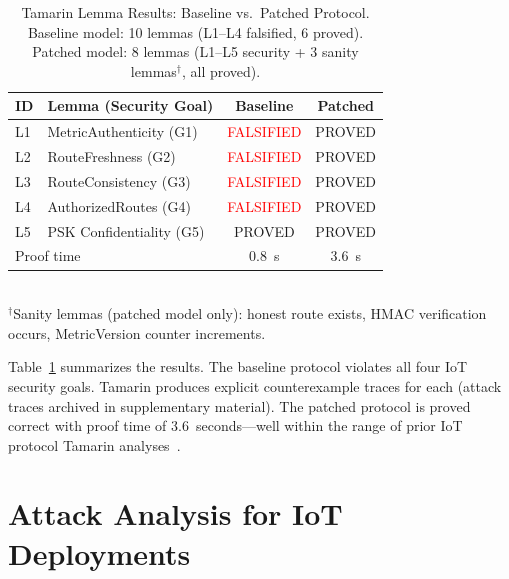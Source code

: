 \documentclass[10pt,journal,compsoc]{IEEEtran}
\begin{document}
\begin{table}[t]
  \centering
  \caption{Tamarin Lemma Results: Baseline vs.\ Patched Protocol.
    Baseline model: 10 lemmas (L1--L4 falsified, 6 proved).
    Patched model: 8 lemmas (L1--L5 security + 3 sanity lemmas$^\dagger$, all proved).}
  \label{tab:tamarin}
  \begin{tabular}{llcc}
    \toprule
    \textbf{ID} & \textbf{Lemma (Security Goal)} &
      \textbf{Baseline} & \textbf{Patched} \\
    \midrule
    L1 & MetricAuthenticity (G1)   & \textcolor{red}{FALSIFIED} & \textcolor{green!60!black}{PROVED} \\
    L2 & RouteFreshness (G2)       & \textcolor{red}{FALSIFIED} & \textcolor{green!60!black}{PROVED} \\
    L3 & RouteConsistency (G3)     & \textcolor{red}{FALSIFIED} & \textcolor{green!60!black}{PROVED} \\
    L4 & AuthorizedRoutes (G4)     & \textcolor{red}{FALSIFIED} & \textcolor{green!60!black}{PROVED} \\
    L5 & PSK Confidentiality (G5)  & \textcolor{green!60!black}{PROVED}  & \textcolor{green!60!black}{PROVED} \\
    \midrule
    \multicolumn{2}{l}{Proof time} & 0.8~s & 3.6~s \\
    \bottomrule
  \end{tabular}\\[2pt]
  \small $^\dagger$Sanity lemmas (patched model only): honest route exists,
    HMAC verification occurs, MetricVersion counter increments.
\end{table}

Table~\ref{tab:tamarin} summarizes the results. The baseline protocol
violates all four IoT security goals. Tamarin produces explicit
counterexample traces for each (attack traces archived in supplementary
material). The patched protocol is proved correct with proof time of
3.6~seconds—well within the range of prior IoT protocol Tamarin
analyses~\cite{ieee2025-kang-tamarin,ieee2025-5g-prose-aka,pereira2025-router-verification,basin2025-tamarin-book}.

\section{Attack Analysis for IoT Deployments}
\label{sec:attacks}
\end{document}
